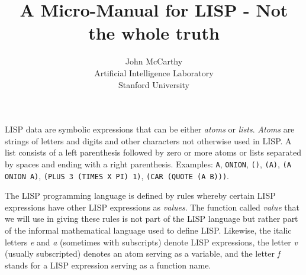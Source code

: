 \documentclass[10pt,a4paper,twocolumn]{article}
\title{A Micro-Manual for LISP - Not the whole truth}
\author{John McCarthy\\
  Artificial Intelligence Laboratory\\
  Stanford University}
\date{}
\begin{document}
\maketitle


LISP data are symbolic expressions that can be either \textit{atoms} or \textit{lists}. \textit{Atoms} are
strings of letters and digits and other characters not otherwise used in LISP. A
list consists of a left parenthesis followed by zero or more atoms or lists
separated by spaces and ending with a right parenthesis. Examples: \texttt{A},
\texttt{ONION}, \texttt{()}, \texttt{(A)}, \texttt{(A ONION A)}, \texttt{(PLUS 3
  (TIMES X PI) 1)}, \texttt{(CAR (QUOTE (A B)))}.

The LISP programming language is defined by rules whereby certain LISP
expressions have other LISP expressions as \textit{values}. The function called \textit{value}
that we will use in giving these rules is not part of the LISP language but
rather part of the informal mathematical language used to define LISP. Likewise,
the italic letters \textit{e} and \textit{a} (sometimes with subscripts) denote
LISP expressions, the letter \textit{v} (usually subscripted) denotes an atom
serving as a variable, and the letter \textit{f} stands for a LISP expression
serving as a function name.
\end{document}
